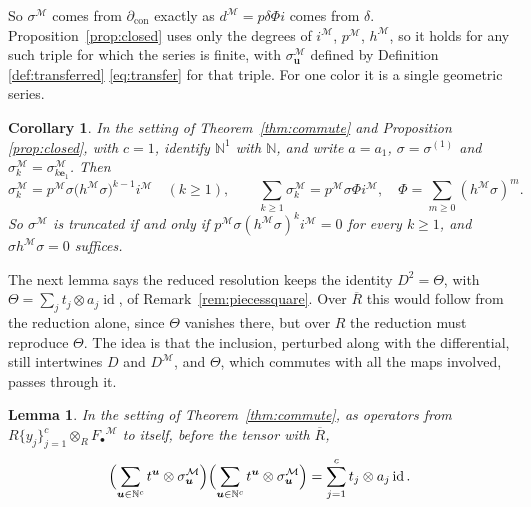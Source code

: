 \documentclass[12pt]{amsart}
\theoremstyle{plain}
\newtheorem{lemma}[theorem]{Lemma}
\newtheorem{corollary}[theorem]{Corollary}
\theoremstyle{definition}
\newcommand{\dcon}{\partial_{\mathrm{con}}}
\newcommand{\F}{ {F_\bullet} }
\newcommand{\Rbar}{\overline{R}}
\newcommand{\M}{\mathcal{M}}
\newcommand{\id}{\operatorname{id}}
\newcommand{\N}{\mathbb{N}}
\begin{document}
So $\sigma^{\M}$ comes from $\dcon$ exactly as $d^{\M} = p \delta \Phi i$ comes from $\delta$. Proposition~\ref{prop:closed} uses only the degrees of $i^{\M}$, $p^{\M}$, $h^{\M}$, so it holds for any such triple for which the series is finite, with $\sigma^{\M}_{\boldsymbol{u}}$ defined by Definition \ref{def:transferred} \eqref{eq:transfer} for that triple. For one color it is a single geometric series.

\begin{corollary}\label{cor:conecolor}
     In the setting of Theorem~\ref{thm:commute} and Proposition \ref{prop:closed}, with $c = 1$,
     identify $\N^1$ with $\N$, and write $a = a_1$, $\sigma = \sigma^{(1)}$ and $\sigma^{\M}_k = \sigma^{\M}_{k \boldsymbol{e}_1}$. Then
    \[
        \sigma^{\M}_k = p^{\M} \sigma \bigl( h^{\M} \sigma \bigr)^{k-1} i^{\M} \quad (k \ge 1), \qquad \sum_{k \ge 1} \sigma^{\M}_k = p^{\M} \sigma \Phi i^{\M}, \quad \Phi = \sum_{m \ge 0} (h^{\M} \sigma)^m .
    \]
     So $\sigma^{\M}$ is truncated if and only if $p^{\M} \sigma (h^{\M} \sigma)^{k} i^{\M} = 0$ for every $k \ge 1$, and $\sigma h^{\M} \sigma = 0$ suffices.
\end{corollary}

The next lemma says the reduced resolution keeps the identity $D^2 = \Theta$,
with $\Theta = \sum_j t_j \otimes a_j \id$, of Remark~\ref{rem:piecessquare}. Over $\Rbar$ this would follow from the reduction alone, since $\Theta$ vanishes there, but over $R$ the reduction must reproduce $\Theta$. The idea is that the inclusion, perturbed along with the differential, still intertwines $D$ and $D^{\M}$, and $\Theta$, which commutes with all the maps involved, passes through it.

\begin{lemma}\label{lem:curved}
     In the setting of Theorem~\ref{thm:commute}, as operators from $R\{y_j\}_{j=1}^{c} \otimes_R \F^{\M}$ to itself, before the tensor with $\Rbar$,
    \[
        \Bigl( \sum_{\boldsymbol{u} \in \N^c} t^{\boldsymbol{u}} \otimes \sigma^{\M}_{\boldsymbol{u}} \Bigr) \Bigl( \sum_{\boldsymbol{u} \in \N^c} t^{\boldsymbol{u}} \otimes \sigma^{\M}_{\boldsymbol{u}} \Bigr) = \sum_{j=1}^{c} t_j \otimes a_j \id .
    \]
\end{lemma}
\end{document}
